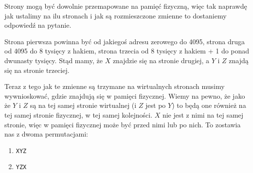 Strony mogą być dowolnie przemapowane na pamięć fizyczną, więc tak naprawdę jak ustalimy na ilu stronach i jak są rozmieszczone zmienne to dostaniemy odpowiedź na pytanie.

Strona pierwsza powinna być od jakiegoś adresu zerowego do 4095, strona druga od 4095 do 8 tysięcy z hakiem, strona trzecia od 8 tysięcy z hakiem + 1 do ponad dwunasty tysięcy. Stąd mamy, że $X$ znajdzie się na stronie drugiej, a $Y$ i $Z$ znajdą się na stronie trzeciej. 

Teraz z tego jak te zmienne są trzymane na wirtualnych stronach musimy wywnioskować, gdzie znajdują się w pamięci fizycznej. Wiemy na pewno, że jako że $Y$ i $Z$ są na tej samej stronie wirtualnej (i $Z$ jest po $Y$) to będą one również na tej samej stronie fizycznej, w tej samej kolejności. $X$ nie jest z nimi na tej samej stronie, więc w pamięci fizycznej może być przed nimi lub po nich. To zostawia nas z dwoma permutacjami:

\begin{enumerate}
    \item \texttt{XYZ}
    \item \texttt{YZX}
\end{enumerate}
